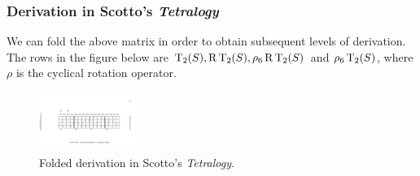 \begin{frame}
	\frametitle{Derivation in Scotto's \emph{Tetralogy}}
	We can fold the above matrix in order to obtain subsequent levels of derivation. The rows in the figure below are $\operatorname{T}_2(S), \operatorname{R}\operatorname{T}_2(S), \rho_6\operatorname{R}\operatorname{T}_2(S)$ and $\rho_6\operatorname{T}_2(S)$, where $\rho$ is the cyclical rotation operator.
	\begin{figure}
    	\centering
		\includegraphics[width=3.2cm, angle=270]{figures/scotto-folded.pdf}
		\caption{Folded derivation in Scotto's \emph{Tetralogy}.}
	\end{figure}
\end{frame}

